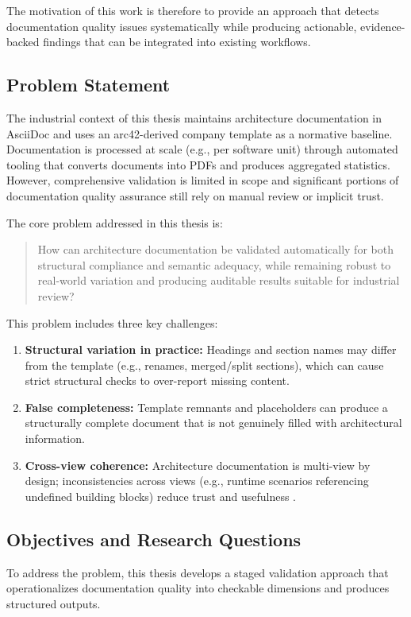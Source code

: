 The motivation of this work is therefore to provide an approach that detects documentation quality issues systematically while producing actionable, evidence-backed findings that can be integrated into existing workflows.

\subsection{Problem Statement}
The industrial context of this thesis maintains architecture documentation in AsciiDoc and uses an arc42-derived company template as a normative baseline. Documentation is processed at scale (e.g., per software unit) through automated tooling that converts documents into PDFs and produces aggregated statistics. However, comprehensive validation is limited in scope and significant portions of documentation quality assurance still rely on manual review or implicit trust.

The core problem addressed in this thesis is:

\begin{quote}
How can architecture documentation be validated automatically for both structural compliance and semantic adequacy, while remaining robust to real-world variation and producing auditable results suitable for industrial review?
\end{quote}

This problem includes three key challenges:
\begin{enumerate}
    \item \textbf{Structural variation in practice:} Headings and section names may differ from the template (e.g., renames, merged/split sections), which can cause strict structural checks to over-report missing content.
    \item \textbf{False completeness:} Template remnants and placeholders can produce a structurally complete document that is not genuinely filled with architectural information.
    \item \textbf{Cross-view coherence:} Architecture documentation is multi-view by design; inconsistencies across views (e.g., runtime scenarios referencing undefined building blocks) reduce trust and usefulness \cite{iso42010,arc42}.
\end{enumerate}

\subsection{Objectives and Research Questions}
To address the problem, this thesis develops a staged validation approach that operationalizes documentation quality into checkable dimensions and produces structured outputs.

